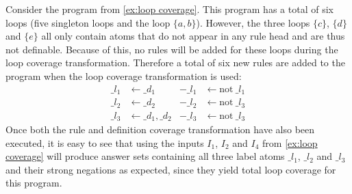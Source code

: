 \begin{example}
\label{ex:loop transformation}
    Consider the program from \cref{ex:loop coverage}. This program has a total of six loops (five singleton loops and the loop $\{a, b\}$). However, the three loops $\{c\}$, $\{d\}$ and $\{e\}$ all only contain atoms that do not appear in any rule head and are thus not definable. Because of this, no rules will be added for these loops during the loop coverage transformation. Therefore a total of six new rules are added to the program when the loop coverage transformation is used:
    \begin{align*}
        \_l_1 &\leftarrow \_d_1  &  -\_l_1 &\leftarrow \text{not}\ \_l_1 \\
        \_l_2 &\leftarrow \_d_2  &  -\_l_2 &\leftarrow \text{not}\ \_l_3 \\
        \_l_3 &\leftarrow \_d_1, \_d_2  &   -\_l_3 &\leftarrow \text{not}\ \_l_3
    \end{align*}
    Once both the rule and definition coverage transformation have also been executed, it is easy to see that using the inputs $I_1$, $I_2$ and $I_4$ from \cref{ex:loop coverage} will produce answer sets containing all three label atoms $\_l_1$, $\_l_2$ and $\_l_3$ and their strong negations as expected, since they yield total loop coverage for this program.
\end{example}

\begin{comment}
- $\_li$ label for every loop i     \/

- first need to find all the loops in the program! -> build positive atom dependency graph, find sccs and then find subsets of sccs that are loops  \/

- for each loop i that consists of atoms $a_m$ to $a_n$ add new rule to program: $\_li :- \_dm, ..., \_dn$.     \/

- if all the atoms $a_m$ to $a_n$ that constitute the loop i are defined (aka definition covered), then all the $\_dm$ to $\_dn$ are true, then loop i is covered and $\_li$ will be in the answer set.     \/

-> $\_li$ in answer set <=> loop i is positively covered

- if any of the atoms $a_m$ to $a_n$ are not defined the loop is negatively covered and  $\_li$ will not be in the answer set       \/

-> $\_li$ not in answer set <=> loop i is negatively covered
\end{comment}

